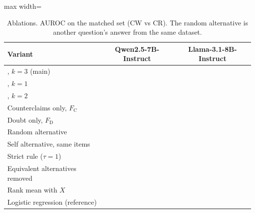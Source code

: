 \begin{table}[t]
\centering
\footnotesize
\caption{Ablations. AUROC on the matched set (CW vs CR). The random alternative is another question's answer from the same dataset.}
\label{tab:ablation}
\begin{adjustbox}{max width=\columnwidth}
\begin{tabular}{lcc}
\toprule
Variant & Qwen2.5-7B-Instruct & Llama-3.1-8B-Instruct \\
\midrule
\cps{}, $k=3$ (main) & \TODO{} & \TODO{} \\
\cps{}, $k=1$ & \TODO{} & \TODO{} \\
\cps{}, $k=2$ & \TODO{} & \TODO{} \\
Counterclaims only, $F_{\mathrm{C}}$ & \TODO{} & \TODO{} \\
Doubt only, $F_{\mathrm{D}}$ & \TODO{} & \TODO{} \\
Random alternative & \TODO{} & \TODO{} \\
Self alternative, same items & \TODO{} & \TODO{} \\
Strict rule ($\tau=1$) & \TODO{} & \TODO{} \\
Equivalent alternatives removed & \TODO{} & \TODO{} \\
Rank mean with $X$ & \TODO{} & \TODO{} \\
Logistic regression (reference) & \TODO{} & \TODO{} \\
\bottomrule
\end{tabular}
\end{adjustbox}
\end{table}
